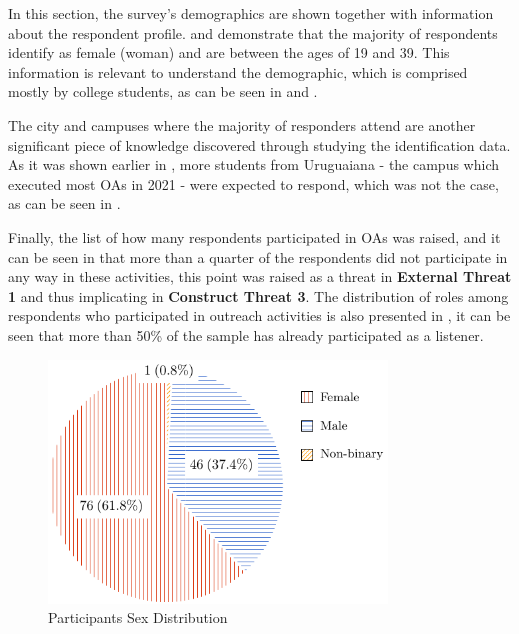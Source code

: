 In this section, the survey's demographics are shown together with information about the respondent profile.
 and  demonstrate that the majority of respondents identify as female (woman) and are between the ages of 19 and 39.
This information is relevant to understand the demographic, which is comprised mostly by college students, as can be seen in  and .

The city and campuses where the majority of responders attend are another significant piece of knowledge discovered through studying the identification data.
As it was shown earlier in , more students from Uruguaiana - the campus which executed most \aclp{OA} in 2021 - were expected to respond, which was not the case, as can be seen in .


Finally, the list of how many respondents participated in \acp{OA} was raised, and it can be seen in  that more than a quarter of the respondents did not participate in any way in these activities, this point was raised as a threat in \textbf{External Threat 1} and thus implicating in \textbf{Construct Threat 3}. The distribution of roles among respondents who participated in outreach activities is also presented in , it can be seen that more than 50\% of the sample has already participated as a listener.

\begin{figure}[!htb]
  \caption{Participants Sex Distribution}\label{fig:sex-distribution}
  \begin{center}
    \includegraphics[width=9cm]{img/5-participants-sex.pdf}
  \end{center}
\end{figure}

